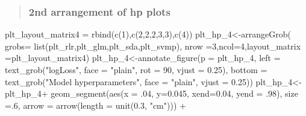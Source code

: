 \documentclass[
]{article}
\newenvironment{Shaded}{\begin{snugshade}}{\end{snugshade}}
\newcommand{\AttributeTok}[1]{\textcolor[rgb]{0.77,0.63,0.00}{#1}}
\newcommand{\DecValTok}[1]{\textcolor[rgb]{0.00,0.00,0.81}{#1}}
\newcommand{\FloatTok}[1]{\textcolor[rgb]{0.00,0.00,0.81}{#1}}
\newcommand{\FunctionTok}[1]{\textcolor[rgb]{0.00,0.00,0.00}{#1}}
\newcommand{\NormalTok}[1]{#1}
\newcommand{\OtherTok}[1]{\textcolor[rgb]{0.56,0.35,0.01}{#1}}
\newcommand{\SpecialCharTok}[1]{\textcolor[rgb]{0.00,0.00,0.00}{#1}}
\newcommand{\StringTok}[1]{\textcolor[rgb]{0.31,0.60,0.02}{#1}}
\begin{document}
\begin{quote}
\hypertarget{nd-arrangement-of-hp-plots}{%
\subsubsection{2nd arrangement of hp
plots}\label{nd-arrangement-of-hp-plots}}
\end{quote}

\begin{Shaded}
\begin{Highlighting}[]
\NormalTok{plt\_layout\_matrix4 }\OtherTok{=} \FunctionTok{rbind}\NormalTok{(}\FunctionTok{c}\NormalTok{(}\DecValTok{1}\NormalTok{),}\FunctionTok{c}\NormalTok{(}\DecValTok{2}\NormalTok{,}\DecValTok{2}\NormalTok{,}\DecValTok{2}\NormalTok{,}\DecValTok{3}\NormalTok{,}\DecValTok{3}\NormalTok{),}\FunctionTok{c}\NormalTok{(}\DecValTok{4}\NormalTok{))}
\NormalTok{plt\_hp\_4}\OtherTok{\textless{}{-}}\FunctionTok{arrangeGrob}\NormalTok{(}
  \AttributeTok{grobs=} \FunctionTok{list}\NormalTok{(plt\_rlr,plt\_glm,plt\_sda,plt\_svmp),}
                         \AttributeTok{nrow =}\DecValTok{3}\NormalTok{,}\AttributeTok{ncol=}\DecValTok{4}\NormalTok{,}\AttributeTok{layout\_matrix =}\NormalTok{plt\_layout\_matrix4)}
\NormalTok{plt\_hp\_4}\OtherTok{\textless{}{-}}\FunctionTok{annotate\_figure}\NormalTok{(}\AttributeTok{p =}\NormalTok{ plt\_hp\_4,}
                            \AttributeTok{left =} \FunctionTok{text\_grob}\NormalTok{(}\StringTok{"logLoss"}\NormalTok{, }\AttributeTok{face =} \StringTok{"plain"}\NormalTok{,}
                                             \AttributeTok{rot =} \DecValTok{90}\NormalTok{, }\AttributeTok{vjust =} \FloatTok{0.25}\NormalTok{),}
                            \AttributeTok{bottom =} \FunctionTok{text\_grob}\NormalTok{(}\StringTok{"Model hyperparameters"}\NormalTok{,}
                                               \AttributeTok{face =} \StringTok{"plain"}\NormalTok{, }\AttributeTok{vjust =} \FloatTok{0.25}\NormalTok{))}
\NormalTok{plt\_hp\_4}\OtherTok{\textless{}{-}}\NormalTok{ plt\_hp\_4}\SpecialCharTok{+}
  \FunctionTok{geom\_segment}\NormalTok{(}\FunctionTok{aes}\NormalTok{(}\AttributeTok{x =}\NormalTok{ .}\DecValTok{04}\NormalTok{, }\AttributeTok{y=}\FloatTok{0.045}\NormalTok{, }\AttributeTok{xend=}\FloatTok{0.04}\NormalTok{, }\AttributeTok{yend =}\NormalTok{ .}\DecValTok{98}\NormalTok{), }\AttributeTok{size =}\NormalTok{.}\DecValTok{6}\NormalTok{,}
               \AttributeTok{arrow =} \FunctionTok{arrow}\NormalTok{(}\AttributeTok{length =} \FunctionTok{unit}\NormalTok{(}\FloatTok{0.3}\NormalTok{, }\StringTok{"cm"}\NormalTok{))) }\SpecialCharTok{+}

\end{Highlighting}
\end{Shaded}
\end{document}
